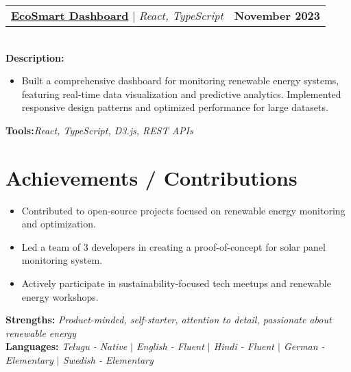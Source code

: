 \documentclass[letterpaper,11pt]{article}
\makeatletter
\newcommand{\resumeItem}[1]{
  \item\small{
    {#1 \vspace{-2pt}}
  }
}
\newcommand{\resumeProjectHeading}[2]{
    \item
    \begin{tabular*}{1.001\textwidth}{l@{\extracolsep{\fill}}r}
      \small#1 & \textbf{\small #2}\\
    \end{tabular*}\vspace{-7pt}
}
\newcommand{\resumeSubHeadingListStart}{\begin{itemize}[leftmargin=0.0in, label={}]}
\newcommand{\resumeSubHeadingListEnd}{\end{itemize}}
\newcommand{\resumeItemListStart}{\begin{itemize}}
\newcommand{\resumeItemListEnd}{\end{itemize}\vspace{-5pt}}
\makeatother
\begin{document}
\resumeProjectHeading
{\href{https://github.com/yakkshit/eco-smart}{\textbf{EcoSmart Dashboard}} $|$ \emph{React, TypeScript}}{November 2023}\\
\vspace{6pt}
\textbf{Description:}
\resumeItemListStart
\resumeItem{Built a comprehensive dashboard for monitoring renewable energy systems, featuring real-time data visualization and predictive analytics. Implemented responsive design patterns and optimized performance for large datasets.}
\resumeItemListEnd
\vspace{4pt}
\textbf{Tools:}\emph{React, TypeScript, D3.js, REST APIs}

\section{Achievements / Contributions}
\resumeSubHeadingListStart
\resumeItemListStart
\resumeItem{Contributed to open-source projects focused on renewable energy monitoring and optimization.}
\resumeItem{Led a team of 3 developers in creating a proof-of-concept for solar panel monitoring system.}
\resumeItem{Actively participate in sustainability-focused tech meetups and renewable energy workshops.}
\resumeItemListEnd

\resumeSubHeadingListEnd
\textbf{Strengths: }\emph{Product-minded, self-starter, attention to detail, passionate about renewable energy} \\
\textbf{Languages: }\emph{Telugu - Native $|$ English - Fluent $|$ Hindi - Fluent $|$ German - Elementary $|$ Swedish - Elementary}

\vspace{10pt}
\end{document}
